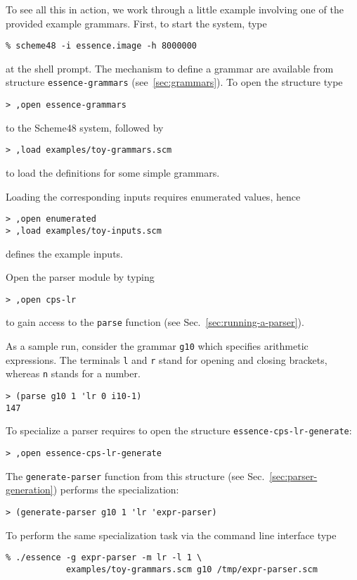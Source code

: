 \documentclass{article}
\newcommand{\codefont}[1]{\texttt{#1}}
\begin{document}
To see all this in action, we work through a little example involving one of
the provided example grammars. First, to start the system, type
\begin{verbatim}
% scheme48 -i essence.image -h 8000000
\end{verbatim}
at the shell prompt. The mechanism to define a grammar are available from
structure \codefont{essence-grammars} (see~\ref{sec:grammars}). To open the structure
type
\begin{verbatim}
> ,open essence-grammars
\end{verbatim}
to the Scheme48 system, followed by
\begin{verbatim}
> ,load examples/toy-grammars.scm
\end{verbatim}
to load the definitions for some simple grammars.

Loading the corresponding inputs requires enumerated values, hence
\begin{verbatim}
> ,open enumerated
> ,load examples/toy-inputs.scm
\end{verbatim}
defines the example inputs.

Open the parser module by typing
\begin{verbatim}
> ,open cps-lr
\end{verbatim}
to gain access to the \codefont{parse}
function (see Sec.~\ref{sec:running-a-parser}). 

As a sample run, consider the grammar \codefont{g10} which specifies arithmetic 
expressions. The terminals \codefont{l} and \codefont{r} stand for opening
and closing brackets, whereas \codefont{n} stands for a number.
\begin{verbatim}
> (parse g10 1 'lr 0 i10-1)
147
\end{verbatim}

To specialize a parser requires to open the structure
\codefont{essence-cps-lr-generate}:
\begin{verbatim}
> ,open essence-cps-lr-generate
\end{verbatim}
The \codefont{generate-parser} function from this structure (see
Sec.~\ref{sec:parser-generation}) performs the specialization:
\begin{verbatim}
> (generate-parser g10 1 'lr 'expr-parser)
\end{verbatim}

To perform the same specialization task via the command line interface type
\begin{verbatim}
% ./essence -g expr-parser -m lr -l 1 \
            examples/toy-grammars.scm g10 /tmp/expr-parser.scm
\end{verbatim}

 

\end{document}
